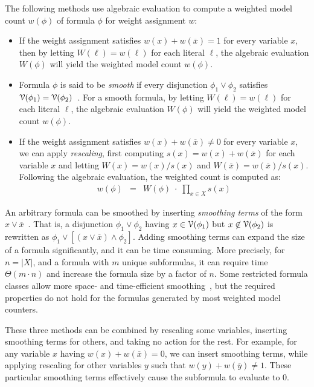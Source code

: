 \documentclass[letterpaper,USenglish,cleveref, autoref, thm-restate]{lipics-v2021}
\newcommand{\obar}[1]{\overline{#1}}
\newcommand{\lit}{\ell}
\newcommand{\varset}{X}
\newcommand{\dependencyset}{{\cal V}}
\begin{document}
The following methods use algebraic evaluation to compute a weighted model count $w(\phi)$ of formula $\phi$ for weight assignment $w$:
\begin{itemize}
\item If the weight assignment satisfies $w(x) + w(\obar{x}) = 1$  for every variable $x$,
  then by letting $W(\lit) = w(\lit)$ for each literal $\lit$, the algebraic evaluation $W(\phi)$ will yield the weighted model count $w(\phi)$.
\item Formula $\phi$ is said to be \emph{smooth} if every disjunction $\phi_1 \lor \phi_2$ satisfies
  $\dependencyset(\phi_1) = \dependencyset(\phi_2)$~\cite{darwiche:jancl:2001,darwiche:jair:2002}.  For a smooth formula, 
by letting $W(\lit) = w(\lit)$ for each literal $\lit$, the algebraic evaluation $W(\phi)$ will yield the weighted model count $w(\phi)$.
\item If the weight assignment satisfies $w(x) + w(\obar{x}) \not = 0$ for every variable $x$,
  we can apply \emph{rescaling}, first computing $s(x) = w(x) + w(\obar{x})$ for each variable $x$
  and letting $W(x) = w(x)/s(x)$ and $W(\obar{x}) = w(\obar{x})/s(x)$.  
  Following the algebraic evaluation, the weighted count is computed as:
  \begin{eqnarray}
w(\phi) &=& W(\phi)\; \cdot \;  \prod_{x\in\varset} s(x)  \label{eqn:rescale}
  \end{eqnarray}
\end{itemize}

An arbitrary formula can be smoothed by inserting \emph{smoothing terms} of the form $x \lor \obar{x}$~\cite{darwiche:jancl:2001}.
That is,
  a disjunction $\phi_1 \lor \phi_2$ having $x \in \dependencyset(\phi_1)$ but
  $x \not\in \dependencyset(\phi_2)$ is rewritten as $\phi_1 \lor [(x \lor \obar{x}) \land \phi_2]$.
  Adding smoothing terms can expand the size of a formula significantly, and it can be time consuming.
  More precisely, for $n = |X|$, and a formula with $m$ unique subformulas, it can require time $\Theta(m\cdot n)$ and increase the formula size by a factor of $n$.
  Some restricted formula classes allow more space- and time-efficient smoothing~\cite{shih:neurips:2019}, but the required properties do not hold for the formulas generated by most weighted model counters.
  
  These three methods can be combined by rescaling some variables,
  inserting smoothing terms for others, and taking no action for the rest.
  For example,
  for any variable $x$ having $w(x) + w(\obar{x}) = 0$, we can insert
  smoothing terms, while applying rescaling for other variables $y$ such that $w(y) + w(\obar{y}) \not= 1$.
These particular smoothing terms
  effectively cause the subformula to evaluate to
  $0$.
\end{document}
